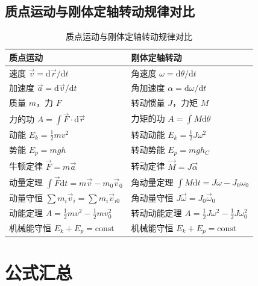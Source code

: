 \documentclass[12pt,a4paper]{ctexart}
\begin{document}
\subsection{质点运动与刚体定轴转动规律对比}

\begin{table}[h]
\centering
\caption{质点运动与刚体定轴转动规律对比}
\begin{tabular}{>{\centering\arraybackslash}p{6cm}>{\centering\arraybackslash}p{6cm}}
\toprule
\textbf{质点运动} & \textbf{刚体定轴转动} \\
\midrule
速度 $\vec{v}=\mathrm{d}\vec{r}/\mathrm{d}t$ & 角速度 $\omega=\mathrm{d}\theta/\mathrm{d}t$ \\
加速度 $\vec{a}=\mathrm{d}\vec{v}/\mathrm{d}t$ & 角加速度 $\alpha=\mathrm{d}\omega/\mathrm{d}t$ \\
质量 $m$，力 $F$ & 转动惯量 $J$，力矩 $M$ \\
力的功 $A=\int\vec{F}\cdot\mathrm{d}\vec{r}$ & 力矩的功 $A=\int M\mathrm{d}\theta$ \\
动能 $E_k=\frac{1}{2}mv^2$ & 转动动能 $E_k=\frac{1}{2}J\omega^2$ \\
势能 $E_p=mgh$ & 转动势能 $E_p=mgh_C$ \\
牛顿定律 $\vec{F}=m\vec{a}$ & 转动定律 $\vec{M}=J\vec{\alpha}$ \\
动量定理 $\int\vec{F}\mathrm{d}t=m\vec{v}-m_0\vec{v}_0$ & 角动量定理 $\int M\mathrm{d}t=J\omega-J_0\omega_0$ \\
动量守恒 $\sum m_i\vec{v}_i=\sum m_i\vec{v}_{i0}$ & 角动量守恒 $J\vec{\omega}=J_0\vec{\omega}_0$ \\
动能定理 $A=\frac{1}{2}mv^2-\frac{1}{2}mv_0^2$ & 转动动能定理 $A=\frac{1}{2}J\omega^2-\frac{1}{2}J\omega_0^2$ \\
机械能守恒 $E_k+E_p=\text{const}$ & 机械能守恒 $E_k+E_p=\text{const}$ \\
\bottomrule
\end{tabular}
\end{table}

\section{公式汇总}
\end{document}
